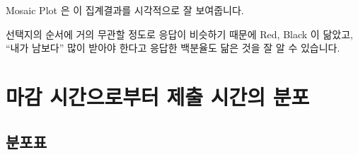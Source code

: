 \documentclass[
]{book}
\begin{document}
Mosaic Plot 은 이 집계결과를 시각적으로 잘 보여줍니다.

선택지의 순서에 거의 무관할 정도로 응답이 비슷하기 때문에 Red, Black 이 닮았고, ``내가 남보다'' 많이 받아야 한다고 응답한 백분율도 닮은 것을 잘 알 수 있습니다.

\section{마감 시간으로부터 제출 시간의 분포}\label{uxb9c8uxac10-uxc2dcuxac04uxc73cuxb85cuxbd80uxd130-uxc81cuxcd9c-uxc2dcuxac04uxc758-uxbd84uxd3ec-5}

\subsection{분포표}\label{uxbd84uxd3ecuxd45c-6}
\end{document}
